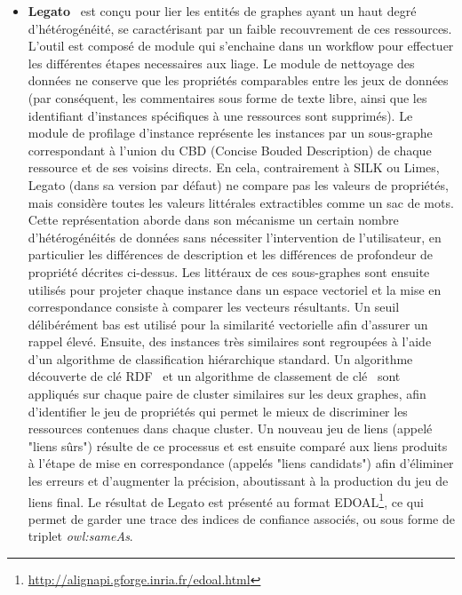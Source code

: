 \begin{itemize}
\item \textbf{Legato}~\cite{AchichiBT17} est conçu pour lier les entités de graphes ayant un haut degré d'hétérogénéité, se caractérisant par un faible recouvrement de ces ressources. L'outil est composé de module qui s'enchaine dans un workflow pour effectuer les différentes étapes necessaires aux liage. Le module de nettoyage des données ne conserve que les propriétés comparables entre les jeux de données (par conséquent, les commentaires sous forme de texte libre, ainsi que les identifiant d'instances spécifiques à une ressources sont supprimés). Le module de profilage d'instance représente les instances par un sous-graphe correspondant à l'union du CBD (Concise Bouded Description) de chaque ressource et de ses voisins directs. En cela, contrairement à SILK ou Limes, Legato (dans sa version par défaut) ne compare pas les valeurs de propriétés, mais considère toutes les valeurs littérales extractibles comme un sac de mots. Cette représentation aborde dans son mécanisme un certain nombre d'hétérogénéités de données sans nécessiter l'intervention de l'utilisateur, en particulier les différences de description et les différences de profondeur de propriété décrites ci-dessus. Les littéraux de ces sous-graphes sont ensuite utilisés pour projeter chaque instance dans un espace vectoriel et la mise en correspondance consiste à comparer les vecteurs résultants. Un seuil délibérément bas est utilisé pour la similarité vectorielle afin d'assurer un rappel élevé. Ensuite, des instances très similaires sont regroupées à l'aide d'un algorithme de classification hiérarchique standard. Un algorithme découverte de clé RDF~\cite{SymeonidouAPS1417} et un algorithme de classement de clé~\cite{Achichi2016} sont appliqués sur chaque paire de cluster similaires sur les deux graphes, afin d'identifier le jeu de propriétés qui permet le mieux de discriminer les ressources contenues dans chaque cluster. Un nouveau jeu de liens (appelé "liens sûrs") résulte de ce processus et est ensuite comparé aux liens produits à l'étape de mise en correspondance (appelés "liens candidats") afin d'éliminer les erreurs et d'augmenter la précision, aboutissant à la production du jeu de liens final. Le résultat de Legato est présenté au format EDOAL\footnote{\url{http://alignapi.gforge.inria.fr/edoal.html}}, ce qui permet de garder une trace des indices de confiance associés, ou sous forme de triplet \textit{owl:sameAs}. \\
\end{itemize}

